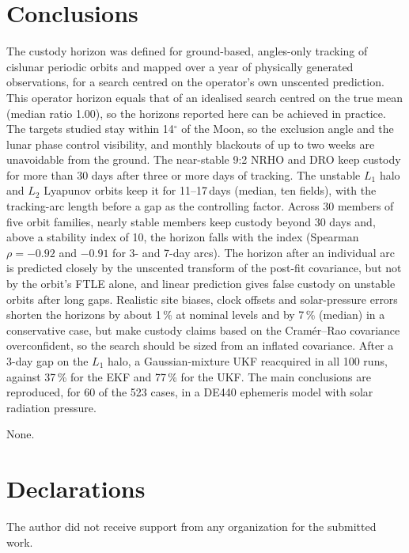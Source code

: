 \documentclass[pdflatex,sn-mathphys-num]{sn-jnl}
\begin{document}
\section{Conclusions}\label{sec:conclusions}

The custody horizon was defined for ground-based, angles-only tracking of cislunar periodic orbits
and mapped over a year of physically generated observations, for a search centred on the operator's
own unscented prediction. This operator horizon equals that of an idealised search centred on the true
mean (median ratio 1.00), so the horizons reported here can be achieved in practice. The targets
studied stay within 14$^\circ$ of the Moon, so the exclusion angle and the lunar phase control
visibility, and monthly blackouts of up to two weeks are unavoidable from the ground. The near-stable
9:2 NRHO and DRO keep custody for more than 30 days after three or more days of tracking. The unstable
$L_1$ halo and $L_2$ Lyapunov orbits keep it for 11--17\,days (median, ten fields), with the
tracking-arc length before a gap as the controlling factor. Across 30 members of five orbit families,
nearly stable members keep custody beyond 30 days and, above a stability index of 10, the horizon falls
with the index (Spearman $\rho = -0.92$ and $-0.91$ for 3- and 7-day arcs). The horizon after an
individual arc is predicted closely by the unscented transform of the post-fit covariance, but not by
the orbit's FTLE alone, and linear prediction gives false custody on unstable orbits after long gaps.
Realistic site biases, clock offsets and solar-pressure errors shorten the horizons by about 1\,\% at
nominal levels and by 7\,\% (median) in a conservative case, but make custody claims based on the
Cram\'er--Rao covariance overconfident, so the search should be sized from an inflated covariance.
After a 3-day gap on the $L_1$ halo, a Gaussian-mixture UKF reacquired in all 100 runs, against
37\,\% for the EKF and 77\,\% for the UKF. The main conclusions are reproduced, for 60 of the 523 cases,
in a DE440 ephemeris model with solar radiation pressure.

None.

\section*{Declarations}

The author did not receive support from any organization for the submitted work.
\end{document}
